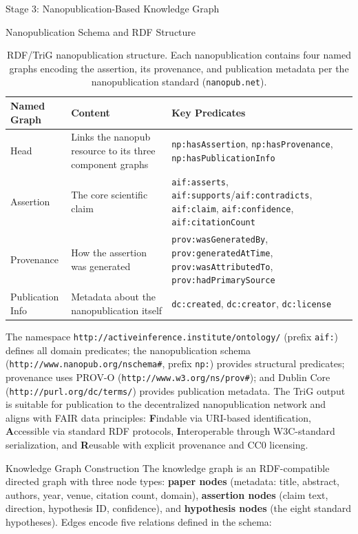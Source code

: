 \documentclass[
  ignorenonframetext,
]{beamer}
\begin{document}
\begin{frame}[fragile]{Stage 3: Nanopublication-Based Knowledge Graph
\label{sec:methods_kg}}
\begin{block}{Nanopublication Schema and RDF Structure}
\begin{table}[htbp]
\centering
\caption{RDF/TriG nanopublication structure. Each nanopublication contains four named graphs encoding the assertion, its provenance, and publication metadata per the nanopublication standard (\texttt{nanopub.net}).}
\label{tab:nanopub_schema}
\begin{tabular}{lll}
\toprule
\textbf{Named Graph} & \textbf{Content} & \textbf{Key Predicates} \\
\midrule
Head & Links the nanopub resource to its three component graphs & \texttt{np:hasAssertion}, \texttt{np:hasProvenance}, \texttt{np:hasPublicationInfo} \\
Assertion & The core scientific claim & \texttt{aif:asserts}, \texttt{aif:supports}/\texttt{aif:contradicts}, \texttt{aif:claim}, \texttt{aif:confidence}, \texttt{aif:citationCount} \\
Provenance & How the assertion was generated & \texttt{prov:wasGeneratedBy}, \texttt{prov:generatedAtTime}, \texttt{prov:wasAttributedTo}, \texttt{prov:hadPrimarySource} \\
Publication Info & Metadata about the nanopublication itself & \texttt{dc:created}, \texttt{dc:creator}, \texttt{dc:license} \\
\bottomrule
\end{tabular}
\end{table}

The namespace \texttt{http://activeinference.institute/ontology/}
(prefix \texttt{aif:}) defines all domain predicates; the
nanopublication schema (\texttt{http://www.nanopub.org/nschema\#},
prefix \texttt{np:}) provides structural predicates; provenance uses
PROV-O (\texttt{http://www.w3.org/ns/prov\#}); and Dublin Core
(\texttt{http://purl.org/dc/terms/}) provides publication metadata. The
TriG output is suitable for publication to the decentralized
nanopublication network and aligns with FAIR data principles:
\textbf{F}indable via URI-based identification, \textbf{A}ccessible via
standard RDF protocols, \textbf{I}nteroperable through W3C-standard
serialization, and \textbf{R}eusable with explicit provenance and CC0
licensing.
\end{block}

\begin{block}{Knowledge Graph Construction}
\protect{}\label{knowledge-graph-construction}
The knowledge graph is an RDF-compatible directed graph with three node
types: \textbf{paper nodes} (metadata: title, abstract, authors, year,
venue, citation count, domain), \textbf{assertion nodes} (claim text,
direction, hypothesis ID, confidence), and \textbf{hypothesis nodes}
(the eight standard hypotheses). Edges encode five relations defined in
the schema:


\end{block}
\end{frame}
\end{document}
